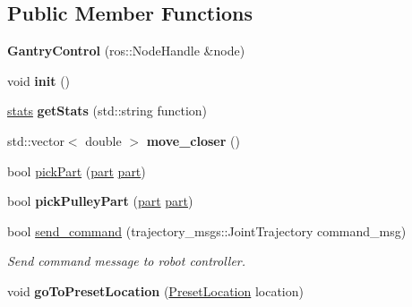 \subsection*{Public Member Functions}
\begin{DoxyCompactItemize}
\item 
\mbox{\label{classGantryControl_a9b8ad2f8dda14130976eb5d9634acbae}} 
{\bfseries Gantry\+Control} (ros\+::\+Node\+Handle \&node)
\item 
\mbox{\label{classGantryControl_a71f13d325c732d931ed5ed175c5b3e7a}} 
void {\bfseries init} ()
\item 
\mbox{\label{classGantryControl_a2ac175070ddb578c03bb5a33cf2d49a4}} 
\hyperlink{structStats}{stats} {\bfseries get\+Stats} (std\+::string function)
\item 
\mbox{\label{classGantryControl_a01f05debc89675930ad525cd8ad8707c}} 
std\+::vector$<$ double $>$ {\bfseries move\+\_\+closer} ()
\item 
bool \hyperlink{classGantryControl_af9280bbee71d1ceca8aef3d616d48254}{pick\+Part} (\hyperlink{structPart}{part} \hyperlink{structPart}{part})
\item 
\mbox{\label{classGantryControl_a9bd30af72a1e857cef7708dd7366eb59}} 
bool {\bfseries pick\+Pulley\+Part} (\hyperlink{structPart}{part} \hyperlink{structPart}{part})
\item 
\mbox{\label{classGantryControl_ab271ce06b0d336eddb26e1ba5a2ce594}} 
bool \hyperlink{classGantryControl_ab271ce06b0d336eddb26e1ba5a2ce594}{send\+\_\+command} (trajectory\+\_\+msgs\+::\+Joint\+Trajectory command\+\_\+msg)
\begin{DoxyCompactList}\small\item\em Send command message to robot controller. \end{DoxyCompactList}\item 
\mbox{\label{classGantryControl_a6986d4f622840037e003c6db840d78ed}} 
void {\bfseries go\+To\+Preset\+Location} (\hyperlink{structPresetLocation}{Preset\+Location} location)
\item 
\mbox{\label{classGantryControl_aaccd9c43b5564c198288ba51cbcecabe}} 

\end{DoxyCompactItemize}
